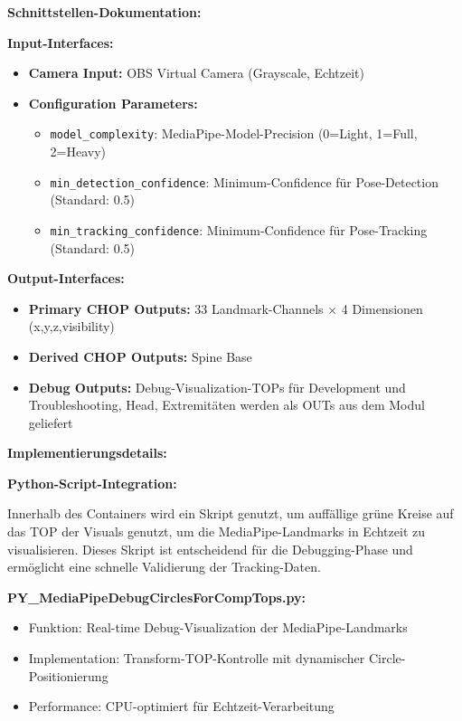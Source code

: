 \textbf{Schnittstellen-Dokumentation:}

\textbf{Input-Interfaces:}
\begin{itemize}
    \item \textbf{Camera Input:} OBS Virtual Camera (Grayscale, Echtzeit)
    \item \textbf{Configuration Parameters:} 
    \begin{itemize}
        \item \texttt{model\_complexity}: MediaPipe-Model-Precision (0=Light, 1=Full, 2=Heavy)
        \item \texttt{min\_detection\_confidence}: Minimum-Confidence für Pose-Detection (Standard: 0.5)
        \item \texttt{min\_tracking\_confidence}: Minimum-Confidence für Pose-Tracking (Standard: 0.5)
    \end{itemize}
\end{itemize}

\textbf{Output-Interfaces:}
\begin{itemize}
    \item \textbf{Primary CHOP Outputs:} 33 Landmark-Channels × 4 Dimensionen (x,y,z,visibility)
    \item \textbf{Derived CHOP Outputs:} Spine Base
    \item \textbf{Debug Outputs:} Debug-Visualization-TOPs für Development und Troubleshooting, Head, Extremitäten werden als OUTs aus dem Modul geliefert
\end{itemize}

\textbf{Implementierungsdetails:}

\textbf{Python-Script-Integration:}

Innerhalb des Containers wird ein Skript genutzt, um auffällige grüne Kreise auf das TOP der Visuals genutzt, um die MediaPipe-Landmarks in Echtzeit zu visualisieren. Dieses Skript ist entscheidend für die Debugging-Phase und ermöglicht eine schnelle Validierung der Tracking-Daten.

\textbf{PY\_MediaPipeDebugCirclesForCompTops.py:}
\begin{itemize}
    \item Funktion: Real-time Debug-Visualization der MediaPipe-Landmarks
    \item Implementation: Transform-TOP-Kontrolle mit dynamischer Circle-Positionierung
    \item Performance: CPU-optimiert für Echtzeit-Verarbeitung
\end{itemize}

